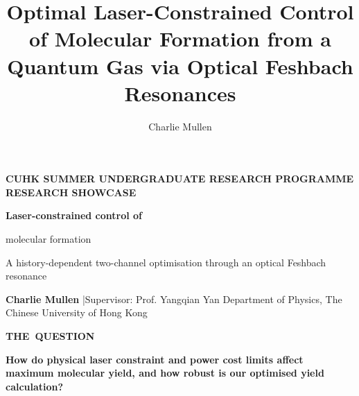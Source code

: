 \documentclass[9pt,a4paper,twocolumn,twoside]{rho-class/rho}
\title{Optimal Laser-Constrained Control of Molecular Formation from a Quantum Gas via Optical Feshbach Resonances}
\author{Charlie Mullen}
\affil{Department of Physics, The Chinese University of Hong Kong}
\begin{document}

\onecolumn
\raggedbottom
\pagestyle{showcasestyle}
\thispagestyle{showcasestyle}

\begin{tcolorbox}[
    enhanced,
    colback=showcasenavy,
    colframe=showcasenavy,
    boxrule=0pt,
    arc=4pt,
    left=7mm,
    right=7mm,
    top=4mm,
    bottom=4mm
]
    {\color{showcasecyan!65!white}\sffamily\bfseries\fontsize{9}{11}\selectfont
    CUHK SUMMER UNDERGRADUATE RESEARCH PROGRAMME \hfill RESEARCH SHOWCASE}

    \vspace{2mm}
    {\color{white}\sffamily\bfseries\fontsize{25}{28}\selectfont
    Laser-constrained control of\par molecular formation\par}
    \vspace{1mm}
    {\color{white!90}\sffamily\fontsize{14}{17}\selectfont
    A history-dependent two-channel optimisation through an optical Feshbach resonance\par}
    \vspace{3mm}
    {\color{white}\sffamily\fontsize{9}{11}\selectfont
    \textbf{Charlie Mullen} \enspace|\enspace Supervisor: Prof. Yangqian Yan
    \hfill Department of Physics, The Chinese University of Hong Kong}
\end{tcolorbox}

\vspace{2mm}
\begin{tcolorbox}[showcasebox,colback=showcasegold!12,colframe=showcasegold,top=1.5mm,bottom=1.5mm]
    \begin{minipage}[c]{0.17\textwidth}
        {\color{showcasegold!75!black}\sffamily\bfseries\fontsize{11}{13}\selectfont
        \mbox{THE QUESTION}}
    \end{minipage}\hfill
    \begin{minipage}[c]{0.79\textwidth}
        {\color{showcaseink}\sffamily\bfseries\fontsize{11.8}{14.5}\selectfont
        How do physical laser constraint and power cost limits affect maximum molecular yield, and how robust is our optimised yield calculation?}
    \end{minipage}
\end{tcolorbox}
\end{document}
